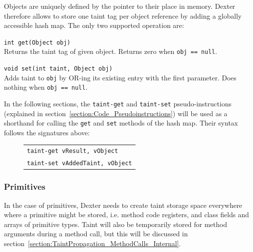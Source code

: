 \documentclass[12pt,twoside,notitlepage]{report}
\newcommand{\centerbox}[1] {
	\begin{center}
	\begin{footnotesize}
	\begin{tabular}{l}
		#1
	\end{tabular}
	\end{footnotesize}
	\end{center}
}
\newcommand{\asm}[1] {\texttt{#1}}
\begin{document}
Objects are uniquely defined by the pointer to their place in memory. Dexter therefore allows to store one taint tag per object reference by adding a globally accessible hash map. The only two supported operation are:
\begin{description} 
\item \verb$int get(Object obj)$ \\
Returns the taint tag of given object. Returns zero when \verb$obj == null$.
\item \verb$void set(int taint, Object obj)$ \\
Adds taint to \verb$obj$ by OR-ing its existing entry with the first parameter. Does nothing when \verb$obj == null$.
\end{description}

In the following sections, the \verb$taint-get$ and \verb$taint-set$ pseudo-instructions (explained in section~\ref{section:Code_Pseudoinstructions}) will be used as a shorthand for calling the \verb$get$ and \verb$set$ methods of the hash map. Their syntax follows the signatures above:

	\begin{figure}[H]
		\centerbox{
			\asm{taint-get vResult, vObject} \\
			\asm{taint-set vAddedTaint, vObject}
		}
	\end{figure}

\subsubsection{Primitives}

\label{section:TaintStorage_Primitives}

In the case of primitives, Dexter needs to create taint storage space everywhere where a primitive might be stored, i.e. method code registers, and class fields and arrays of primitive types. Taint will also be temporarily stored for method arguments during a method call, but this will be discussed in section~\ref{section:TaintPropagation_MethodCalls_Internal}.
\end{document}
